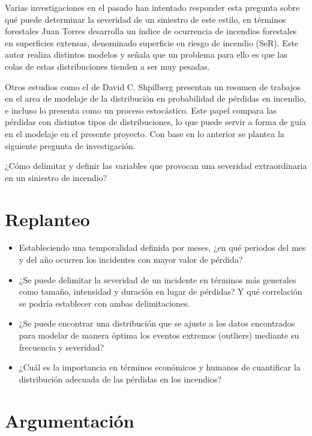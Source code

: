\documentclass[
  oneside]{memoir}
\begin{document}
Varias investigaciones en el pasado han intentado responder esta
pregunta sobre qué puede determinar la severidad de un siniestro de este
estilo, en términos forestales Juan Torres \citep{rojo} desarrolla un
índice de ocurrencia de incendios forestales en superficies extensas,
denominado superficie en riesgo de incendio (SeR). Este autor realiza
distintos modelos y señala que un problema para ello es que las colas de
estas distribuciones tienden a ser muy pesadas.

Otros estudios como el de David C. Shpilberg \citep{shpilberg} presentan
un resumen de trabajos en el area de modelaje de la distribución en
probabilidad de pérdidas en incendio, e incluso lo presenta como un
proceso estocástico. Este papel compara las pérdidas con distintos tipos
de distribuciones, lo que puede servir a forma de guía en el modelaje en
el presente proyecto. Con base en lo anterior se plantea la siguiente
pregunta de investigación.

¿Cómo delimitar y definir las variables que provocan una severidad
extraordinaria en un siniestro de incendio?

\section{Replanteo}

\begin{itemize}
  \item Estableciendo una temporalidad definida por meses, ¿en qué periodos del mes y del año ocurren los incidentes con mayor valor de pérdida?
  \item ¿Se puede delimitar la severidad de un incidente en términos más generales como tamaño, intensidad y duración en lugar de pérdidas? Y qué correlación se podría establecer con ambas delimitaciones.
  \item ¿Se puede encontrar una distribución que se ajuste a los datos encontrados para modelar de manera óptima los eventos extremos (outliers) mediante su frecuencia y severidad?
  \item ¿Cuál es la importancia en términos económicos y humanos de cuantificar la distribución adecuada de las pérdidas en los incendios?
\end{itemize}

\section{Argumentación}
\end{document}
